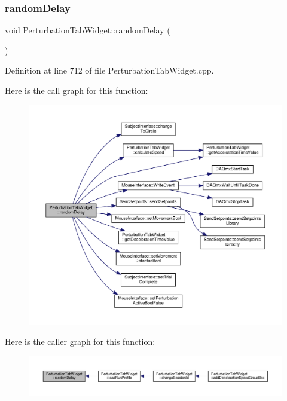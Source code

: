 \subsubsection{\texorpdfstring{random\+Delay}{randomDelay}}
{\footnotesize\ttfamily void Perturbation\+Tab\+Widget\+::random\+Delay (\begin{DoxyParamCaption}{ }\end{DoxyParamCaption})\hspace{0.3cm}{\ttfamily [slot]}}



Definition at line 712 of file Perturbation\+Tab\+Widget.\+cpp.

Here is the call graph for this function\+:
\nopagebreak
\begin{figure}[H]
\begin{center}
\leavevmode
\includegraphics[width=350pt]{class_perturbation_tab_widget_a09c65ab9737d61975cebc94fe843482d_cgraph}
\end{center}
\end{figure}
Here is the caller graph for this function\+:
\nopagebreak
\begin{figure}[H]
\begin{center}
\leavevmode
\includegraphics[width=350pt]{class_perturbation_tab_widget_a09c65ab9737d61975cebc94fe843482d_icgraph}
\end{center}
\end{figure}
\mbox{\label{class_perturbation_tab_widget_ad623552392a607d427df1e76c3b0d110}} 
